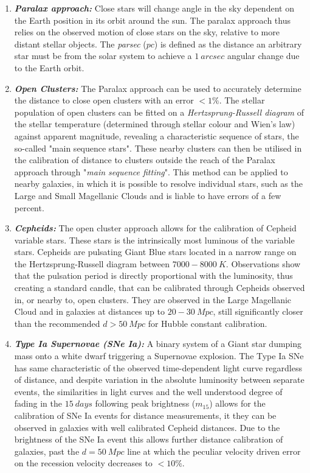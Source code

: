 \documentclass[a4paper, 12pt, twoside]{article}
\begin{document}
\begin{enumerate}
\item {\bf \emph{Paralax approach:}} Close stars will change angle in the sky dependent on the Earth position in its orbit around the sun. The paralax approach thus relies on the observed motion of close stars on the sky, relative to more distant stellar objects. The \emph{parsec} ($pc$) is defined as the distance an arbitrary star must be from the solar system to achieve a $1\ arcsec$ angular change due to the Earth orbit. 
\item {\bf \emph{Open Clusters:}} The Paralax approach can be used to accurately determine the distance to close open clusters with an error $<1\%$. The stellar population of open clusters can be fitted on a \emph{Hertzsprung-Russell diagram} of the stellar temperature (determined through stellar colour and Wien's law) against apparent magnitude, revealing a characteristic sequence of stars, the so-called "main sequence stars". These nearby clusters can then be utilised in the calibration of distance to clusters outside the reach of the Paralax approach through "\emph{main sequence fitting}". This method can be applied to nearby galaxies, in which it is possible to resolve individual stars, such as the Large and Small Magellanic Clouds and is liable to have errors of a few percent.
\item {\bf \emph{Cepheids:}} The open cluster approach allows for the calibration of Cepheid variable stars. These stars is the intrinsically most luminous of the variable stars. Cepheids are pulsating Giant Blue stars located in a narrow range on the Hertzsprung-Russell diagram between $7000-8000\ K$. Observations show that the pulsation period is directly proportional with the luminosity, thus creating a standard candle, that can be calibrated through Cepheids observed in, or nearby to, open clusters. They are observed in the Large Magellanic Cloud and in galaxies at distances up to $20-30\ Mpc$, still significantly closer than the recommended $d>50\ Mpc$ for Hubble constant calibration.
\item {\bf \emph{Type Ia Supernovae (SNe Ia):}} A binary system of a Giant star dumping mass onto a white dwarf triggering a Supernovae explosion. The Type Ia SNe has same characteristic of the observed time-dependent light curve regardless of distance, and despite variation in the absolute luminosity between separate events, the similarities in light curves and the well understood degree of fading in the $15\ days$ following peak brightness ($m_{15}$) allows for the calibration of SNe Ia events for distance measurements, it they can be observed in galaxies with well calibrated Cepheid distances. Due to the brightness of the SNe Ia event this allows further distance calibration of galaxies, past the $d=50\ Mpc$ line at which the peculiar velocity driven error on the recession velocity decreases to $<10\%$.

\end{enumerate}
\end{document}
